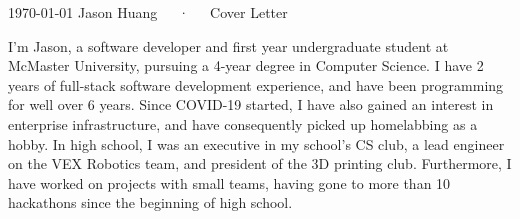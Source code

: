 \documentclass[11pt, letter]{awesome-cv}
\begin{document}
\makecvheader[R]

\makecvfooter
  {\today}
  {Jason Huang~~~·~~~Cover Letter}
  {}

\makelettertitle

\begin{cvletter}

I'm Jason, a software developer and first year undergraduate student at McMaster University,
pursuing a 4-year degree in Computer Science.
I have 2 years of full-stack software development experience, 
and have been programming for well over 6 years.
Since COVID-19 started, I have also gained an interest in enterprise infrastructure,
and have consequently picked up homelabbing as a hobby.
In high school, I was an executive in my school's CS club,
a lead engineer on the VEX Robotics team,
and president of the 3D printing club.
Furthermore, I have worked on projects with small teams, 
having gone to more than 10 hackathons since the beginning of high school.


\end{cvletter}
\end{document}
